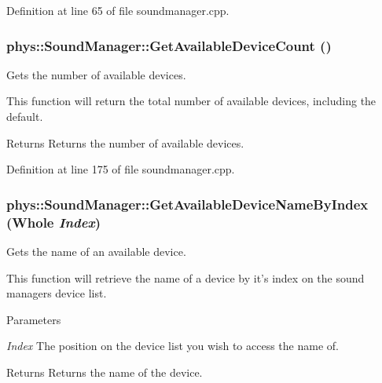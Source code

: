 Definition at line 65 of file soundmanager.cpp.

\hypertarget{classphys_1_1SoundManager_adb5717af71da8829600fd613a2ce615b}{
\subsubsection[{GetAvailableDeviceCount}]{ phys::SoundManager::GetAvailableDeviceCount ()}}
\label{d1/dc4/classphys_1_1SoundManager_adb5717af71da8829600fd613a2ce615b}


Gets the number of available devices. 

This function will return the total number of available devices, including the default. \begin{DoxyReturn}{Returns}
Returns the number of available devices. 
\end{DoxyReturn}


Definition at line 175 of file soundmanager.cpp.

\hypertarget{classphys_1_1SoundManager_a842f7cba6b12585bca77f642ecb8be79}{
\subsubsection[{GetAvailableDeviceNameByIndex}]{ phys::SoundManager::GetAvailableDeviceNameByIndex ({\bf Whole} {\em Index})}}
\label{d1/dc4/classphys_1_1SoundManager_a842f7cba6b12585bca77f642ecb8be79}


Gets the name of an available device. 

This function will retrieve the name of a device by it's index on the sound managers device list. 
\begin{DoxyParams}{Parameters}
\item[{\em Index}]The position on the device list you wish to access the name of. \end{DoxyParams}
\begin{DoxyReturn}{Returns}
Returns the name of the device. 
\end{DoxyReturn}


